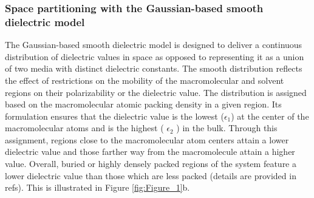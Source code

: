 \documentclass[9pt,tutorial]{livecoms}
\begin{document}
\subsubsection{Space partitioning with the Gaussian-based smooth dielectric model}
The Gaussian-based smooth dielectric model is designed to deliver a continuous distribution of dielectric values in space as opposed to representing it as a union of two media with distinct dielectric constants. 
The smooth distribution reflects the effect of restrictions on the mobility of the macromolecular and solvent regions on their polarizability or the dielectric value. The distribution is assigned based on the macromolecular atomic packing density in a given region. Its formulation ensures that the dielectric value is the lowest ($ \epsilon_1 $) at the center of the macromolecular atoms and is the highest ( $ \epsilon_2 $ ) in the bulk. Through this assignment, regions close to the macromolecular atom centers attain a lower dielectric value and those farther way from the macromolecule attain a higher value. Overall, buried or highly densely packed regions of the system feature a lower dielectric value than those which are less packed (details are provided in refs\cite{chakravorty2019grid,decherchi2013between}). This is illustrated in Figure \ref{fig:Figure_1}b.
\end{document}

